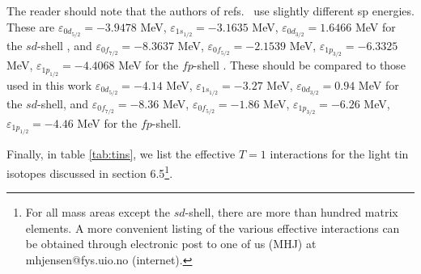The reader should note that the authors of refs.\ \cite{brown88,richt91}
use slightly different sp energies. These are
$\varepsilon_{0d_{5/2}}=-3.9478$ MeV,
$\varepsilon_{1s_{1/2}}=-3.1635$ MeV,
$\varepsilon_{0d_{3/2}}=1.6466$ MeV for the $sd$-shell \cite{brown88},
and 
$\varepsilon_{0f_{7/2}}=-8.3637$ MeV,
$\varepsilon_{0f_{5/2}}=-2.1539$ MeV,
$\varepsilon_{1p_{3/2}}=-6.3325$ MeV,
$\varepsilon_{1p_{1/2}}=-4.4068$ MeV for the
$fp$-shell \cite{richt91}.
These should be compared to those used in this work 
$\varepsilon_{0d_{5/2}}=-4.14$ MeV,
$\varepsilon_{1s_{1/2}}=-3.27$ MeV,
$\varepsilon_{0d_{3/2}}=0.94$ MeV for the $sd$-shell,
and 
$\varepsilon_{0f_{7/2}}=-8.36$ MeV,
$\varepsilon_{0f_{5/2}}=-1.86$ MeV,
$\varepsilon_{1p_{3/2}}=-6.26$ MeV,
$\varepsilon_{1p_{1/2}}=-4.46$ MeV for the
$fp$-shell. 

Finally, in table \ref{tab:tins}, we list the effective $T=1$
interactions
for the light tin isotopes discussed in section 6.5\footnote{For
all mass areas except the $sd$-shell, there are more than
hundred matrix elements. A more convenient listing of the various
effective interactions can be obtained through electronic
post to one of us (MHJ) at mhjensen@fys.uio.no (internet).}.

